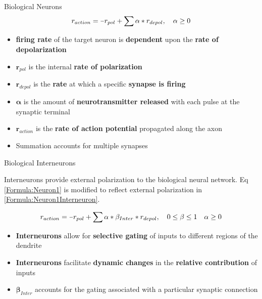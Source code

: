 \documentclass[final]{beamer}
\newlength{\colwidth}
\newcommand{\minus}{\scalebox{0.75}[1.0]{$-$}}
\begin{document}
\begin{frame}[t]
\begin{columns}[t]
\begin{column}{\colwidth}
\begin{block}{Biological Neurons}
    \begin{equation}
      \label{Formula:Neuron1}
      r_{action} = \minus r_{pol} + \sum  \alpha * r_{depol}, \quad \alpha \geq 0
    \end{equation}

    \begin{itemize}
      \item \textbf{firing rate} of the target neuron is \textbf{dependent} upon the \textbf{rate of depolarization}
      \item $\boldsymbol r_{pol}$ is the internal \textbf{rate of polarization}
      \item $\boldsymbol r_{depol}$ is the \textbf{rate} at which a specific \textbf{synapse is firing}
      \item $\boldsymbol \alpha$ is the amount of \textbf{neurotransmitter released} with each pulse at the synaptic terminal
      \item $\boldsymbol r_{action}$ is the \textbf{rate of action potential} propagated along the axon
      \item Summation accounts for multiple synapses
    \end{itemize}

  \end{block}

  \begin{block}{Biological Interneurons}

    Interneurons provide external polarization to the biological neural network. Eq \ref{Formula:Neuron1} is modified to reflect external polarization in \ref{Formula:Neuron1Interneuron}.

    \begin{equation}
      \label{Formula:Neuron1Interneuron}
      r_{action} = \minus r_{pol} + \sum  \alpha *\beta_{Inter}* r_{depol}, \quad 0 \leq \beta \leq 1 \quad \alpha \geq 0
    \end{equation}

    \begin{itemize}
      \item \textbf{Interneurons} allow for \textbf{selective gating} of inputs to different regions of the dendrite
      \item \textbf{Interneurons} facilitate \textbf{dynamic changes} in the \textbf{relative contribution} of inputs
      \item $\boldsymbol \beta_{Inter}$ accounts for the gating associated with a particular synaptic connection
    \end{itemize}
    

\end{block}
\end{column}
\end{columns}
\end{frame}
\end{document}
